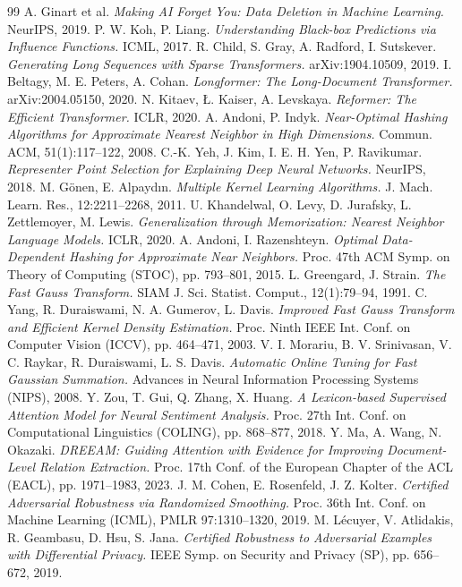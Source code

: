 \documentclass[10pt,twocolumn]{article}
\begin{document}
\begin{thebibliography}{99}
 A. Ginart et al. \emph{Making AI Forget You: Data Deletion in Machine Learning.} NeurIPS, 2019.
 P. W. Koh, P. Liang. \emph{Understanding Black-box Predictions via Influence Functions.} ICML, 2017.
 R. Child, S. Gray, A. Radford, I. Sutskever. \emph{Generating Long Sequences with Sparse Transformers.} arXiv:1904.10509, 2019.
 I. Beltagy, M. E. Peters, A. Cohan. \emph{Longformer: The Long-Document Transformer.} arXiv:2004.05150, 2020.
 N. Kitaev, {\L}. Kaiser, A. Levskaya. \emph{Reformer: The Efficient Transformer.} ICLR, 2020.
 A. Andoni, P. Indyk. \emph{Near-Optimal Hashing Algorithms for Approximate Nearest Neighbor in High Dimensions.} Commun. ACM, 51(1):117--122, 2008.
 C.-K. Yeh, J. Kim, I. E. H. Yen, P. Ravikumar. \emph{Representer Point Selection for Explaining Deep Neural Networks.} NeurIPS, 2018.
 M. G\"onen, E. Alpayd\i n. \emph{Multiple Kernel Learning Algorithms.} J. Mach. Learn. Res., 12:2211--2268, 2011.
 U. Khandelwal, O. Levy, D. Jurafsky, L. Zettlemoyer, M. Lewis. \emph{Generalization through Memorization: Nearest Neighbor Language Models.} ICLR, 2020.
 A. Andoni, I. Razenshteyn. \emph{Optimal Data-Dependent Hashing for Approximate Near Neighbors.} Proc. 47th ACM Symp. on Theory of Computing (STOC), pp. 793--801, 2015.
 L. Greengard, J. Strain. \emph{The Fast Gauss Transform.} SIAM J. Sci. Statist. Comput., 12(1):79--94, 1991.
 C. Yang, R. Duraiswami, N. A. Gumerov, L. Davis. \emph{Improved Fast Gauss Transform and Efficient Kernel Density Estimation.} Proc. Ninth IEEE Int. Conf. on Computer Vision (ICCV), pp. 464--471, 2003.
 V. I. Morariu, B. V. Srinivasan, V. C. Raykar, R. Duraiswami, L. S. Davis. \emph{Automatic Online Tuning for Fast Gaussian Summation.} Advances in Neural Information Processing Systems (NIPS), 2008.
 Y. Zou, T. Gui, Q. Zhang, X. Huang. \emph{A Lexicon-based Supervised Attention Model for Neural Sentiment Analysis.} Proc. 27th Int. Conf. on Computational Linguistics (COLING), pp. 868--877, 2018.
 Y. Ma, A. Wang, N. Okazaki. \emph{DREEAM: Guiding Attention with Evidence for Improving Document-Level Relation Extraction.} Proc. 17th Conf. of the European Chapter of the ACL (EACL), pp. 1971--1983, 2023.
 J. M. Cohen, E. Rosenfeld, J. Z. Kolter. \emph{Certified Adversarial Robustness via Randomized Smoothing.} Proc. 36th Int. Conf. on Machine Learning (ICML), PMLR 97:1310--1320, 2019.
 M. L\'ecuyer, V. Atlidakis, R. Geambasu, D. Hsu, S. Jana. \emph{Certified Robustness to Adversarial Examples with Differential Privacy.} IEEE Symp. on Security and Privacy (SP), pp. 656--672, 2019.
\end{thebibliography}
\end{document}
